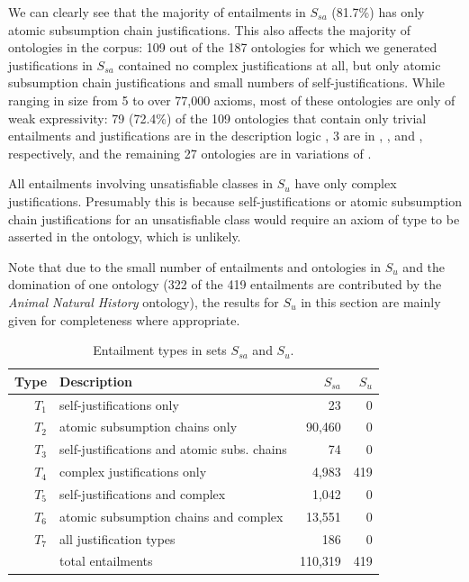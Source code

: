 We can clearly see that the majority of entailments in $S_{sa}$ (81.7\%) has only atomic subsumption chain justifications. This also affects the majority of ontologies in the corpus: 109 out of the 187 ontologies for which we generated justifications in $S_{sa}$ contained no complex justifications at all, but only atomic subsumption chain justifications and small numbers of self-justifications. While ranging in size from 5 to over 77,000 axioms, most of these ontologies are only of weak expressivity: 79 (72.4\%) of the 109 ontologies that contain only trivial entailments and justifications are in the description logic \elplusplus, 3 are in , , and , respectively, and the remaining 27 ontologies are in  variations of .

All entailments involving unsatisfiable classes in $S_{u}$ have only complex justifications. Presumably this is because self-justifications or atomic subsumption chain justifications for an unsatisfiable class would require an axiom of type  to be asserted in the ontology, which is unlikely.

Note that due to the small number of entailments and ontologies in $S_{u}$ and the domination of one ontology (322 of the 419 entailments are contributed by the \emph{Animal Natural History} ontology), the results for $S_{u}$ in this section are mainly given for completeness where appropriate. 

\begin{table}[htb]
\centering
\caption{Entailment types in sets $S_{sa}$ and $S_{u}$.}
\label{tab:entailmenttypes}	
\begin{tabu}{rlrr}
\toprule
Type & Description & $S_{sa}$ & $S_{u}$ \\
\midrule
$T_{1}$ & self-justifications only & 23 & 0 \\
$T_{2}$ & atomic subsumption chains only & 90,460 & 0 \\
$T_{3}$ & self-justifications and atomic subs. chains &  74 & 0 \\
$T_{4}$ & complex justifications only & 4,983  & 419 \\
$T_{5}$ & self-justifications and complex & 1,042 & 0\\
$T_{6}$ & atomic subsumption chains and complex & 13,551 & 0 \\
$T_{7}$ & all justification types & 186 & 0 \\
 		& total entailments 	& 	110,319	& 419 \\ 
\bottomrule 
\end{tabu} 
\end{table}


